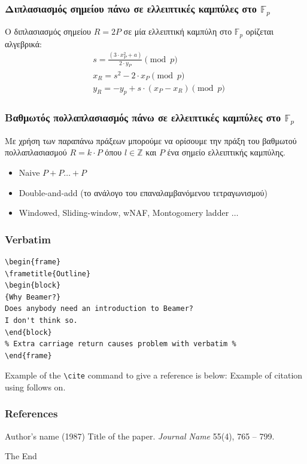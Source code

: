 \documentclass{beamer}
\begin{document}
%
\begin{frame}
\frametitle{Διπλασιασμός σημείου πάνω σε ελλειπτικές καμπύλες στο $\mathbb{F}_p$}
Ο διπλασιασμός σημείου $R = 2P$ σε μία ελλειπτική καμπύλη στο $\mathbb{F}_p$ ορίζεται αλγεβρικά:
 \begin{align*}
  & s = \frac{(3 \cdot x^2_P + a)}{2 \cdot y_P} \pmod p \\
  & x_R = s^2 - 2 \cdot x _P \pmod p \\
  & y_R = -y_p + s \cdot (x_P - x_R) \pmod p
 \end{align*}
\end{frame}

%
\begin{frame}
\frametitle{Βαθμωτός πολλαπλασιασμός πάνω σε ελλειπτικές καμπύλες στο $\mathbb{F}_p$}
Με χρήση των παραπάνω πράξεων μπορούμε να ορίσουμε την πράξη του βαθμωτού πολλαπλασιασμού $R = k \cdot P$ όπου $l \in \mathbb{Z}$ και $P$ ένα σημείο ελλειπτικής καμπύλης.
\begin{itemize}
\item Naive $P + P  \ldots + P$
\item Double-and-add (το ανάλογο του επαναλαμβανόμενου τετραγωνισμού)
\item Windowed, Sliding-window, wNAF, Montogomery ladder $\ldots$ %
\end{itemize}
\end{frame}

%
\begin{frame}[fragile] %
\frametitle{Verbatim}
\begin{example}
\begin{verbatim}
\begin{frame}
\frametitle{Outline}
\begin{block}
{Why Beamer?}
Does anybody need an introduction to Beamer?
I don't think so.
\end{block}
% Extra carriage return causes problem with verbatim %
\end{frame}\end{verbatim} 
\end{example}
\end{frame}
 
\begin{frame}[fragile]  %
Example of the \verb|\cite| command to give a reference is below:
Example of citation using \cite{key1} follows on.
\end{frame}
 
\begin{frame}
\frametitle{References}
\footnotesize{
\begin{thebibliography}{99}
  Author's name (1987)
 \newblock Title of the paper.
 \newblock \emph{Journal Name} 55(4), 765 -- 799.
\end{thebibliography}
}
\end{frame}
 
\begin{frame}
\centerline{The End}
\end{frame}
\end{document}
